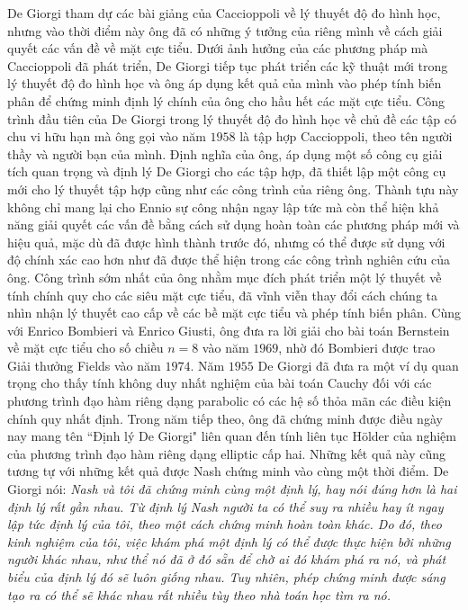 \begin{multicols}{2}
\begin{figure}[H]
		\vspace*{-15pt}
	\end{figure}
	De Giorgi tham dự các bài giảng của Caccioppoli về lý thuyết độ đo hình học, nhưng vào thời điểm này ông đã có những ý tưởng của riêng mình về cách giải quyết các vấn đề về mặt cực tiểu. Dưới ảnh hưởng của các phương pháp mà Caccioppoli đã phát triển, De Giorgi tiếp tục phát triển các kỹ thuật mới trong lý thuyết độ đo hình học và ông áp dụng kết quả của mình vào phép tính biến phân để chứng minh định lý chính của ông cho hầu hết các mặt cực tiểu. Công trình đầu tiên của De Giorgi trong lý thuyết độ đo hình học về chủ đề các tập có chu vi hữu hạn mà ông gọi vào năm $1958$ là tập hợp Caccioppoli, theo tên người thầy và người bạn của mình. Định nghĩa của ông, áp dụng một số công cụ giải tích quan trọng và định lý De Giorgi cho các tập hợp, đã thiết lập một công cụ mới cho lý thuyết tập hợp cũng như các công trình của riêng ông. Thành tựu này không chỉ mang lại cho Ennio sự công nhận ngay lập tức mà còn thể hiện khả năng giải quyết các vấn đề bằng cách sử dụng hoàn toàn các phương pháp mới và hiệu quả, mặc dù đã được hình thành trước đó, nhưng có thể được sử dụng với độ chính xác cao hơn như  đã được thể hiện trong các công trình nghiên cứu của ông. Công trình sớm nhất  của ông nhằm mục đích phát triển một lý thuyết về tính chính quy cho các siêu  mặt cực tiểu, đã vĩnh viễn thay đổi cách chúng ta nhìn nhận lý thuyết cao cấp về các bề mặt cực tiểu và phép tính biến phân. Cùng với Enrico Bombieri và Enrico Giusti, ông đưa ra lời giải cho bài toán Bernstein về  mặt cực tiểu cho số chiều $n= 8$  vào năm $1969$, nhờ đó Bombieri được trao Giải thưởng Fields  vào năm $1974$.
	\vskip 0.1cm
	Năm $1955$ De Giorgi đã đưa ra một ví dụ quan trọng cho thấy tính không duy nhất nghiệm của bài toán Cauchy đối với các phương trình đạo hàm riêng dạng parabolic có các hệ số thỏa mãn các điều kiện chính quy nhất định. Trong năm tiếp theo, ông đã chứng minh được điều ngày nay mang tên ``Định lý De Giorgi" liên quan đến tính liên tục Hölder của nghiệm của phương trình đạo hàm riêng dạng elliptic cấp hai. Những kết quả này cũng tương tự với những kết quả được Nash chứng minh vào cùng một thời điểm. De Giorgi nói:
	\vskip 0.1cm
	\textit{Nash và tôi đã chứng minh cùng một định lý, hay nói đúng hơn là hai định lý rất gần nhau. Từ định lý Nash người ta có thể suy ra nhiều hay ít ngay lập tức định lý của tôi, theo một cách chứng minh hoàn toàn khác. Do đó, theo kinh nghiệm của tôi, việc khám phá một định lý có thể được thực hiện bởi những người khác nhau, như thể nó đã ở đó sẵn để chờ ai đó khám phá ra nó, và phát biểu của định lý đó sẽ luôn giống nhau. Tuy nhiên, phép chứng minh được sáng tạo ra có thể sẽ khác nhau rất nhiều tùy theo nhà toán học tìm ra nó.}

\end{multicols}
